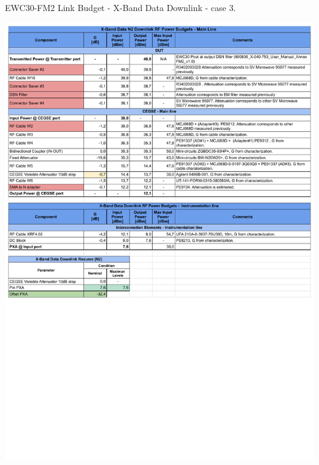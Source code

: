 \begin{table}[H]
	\centering
	\caption{EWC30-FM2 Link Budget - X-Band Data Downlink - case 3.} \label{tb:Data_DSNFM2}
	\includegraphics[page=1, scale=0.75, trim=0cm 0cm 0cm 0cm, clip ]
	{tables/Ensayos COMM-SS Link Budget -DSN X-Band Data N2 Downlink.pdf}\\
\end{table}